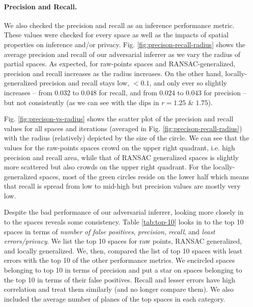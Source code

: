 \paragraph{Precision and Recall.} We also checked the precision and recall as an inference performance metric. These values were checked for every space as well as the impacts of spatial properties on inference and/or privacy. Fig. \ref{fig:precison-recall-radius} shows the average precision and recall of our adversarial inferrer as we vary the radius of partial spaces. As expected, for raw-points spaces and RANSAC-generalized, precision and recall increases as the radius increases. On the other hand, locally-generalized precision and recall stays low, $<0.1$, and only ever so slightly increases -- from $0.032$ to $0.048$ for recall, and from $0.024$ to $0.043$ for precision -- but not consistently (as we  can see with the dips in $r = 1.25$ \& $1.75$).

Fig. \ref{fig:precison-vs-radius} shows the scatter plot of the precision and recall values for all spaces and iterations (averaged in Fig. \ref{fig:precison-recall-radius}) with the radius (relatively) depicted by the size of the circle. We can see that the values for the raw-points spaces crowd on the upper right quadrant, i.e. high precision and recall area, while that of RANSAC generalized spaces is slightly more scattered but also crowds on the upper right quadrant. For the locally-generalized spaces, most of the green circles reside on the lower half which means that recall is spread from low to mid-high but precision values are mostly very low.

Despite the bad performance of our adversarial inferrer, looking more closely in to the spaces reveals some consistency. Table \ref{tab:top-10} looks in to the top 10 spaces in terms of \textit{number of false positives}, \textit{precision}, \textit{recall}, and \textit{least errors/privacy}. We list the top 10 spaces for raw points, RANSAC generalized, and locally generalized. We, then, compared the list of top 10 spaces with least errors with the top 10 of the other performance metrics. We encircled spaces belonging to top 10 in terms of precision and put a star on spaces belonging to the top 10 in terms of their false positives. Recall and lesser errors have high correlation and treat them similarly (and no longer compare them). We also included the average number of planes of the top spaces in each category.

